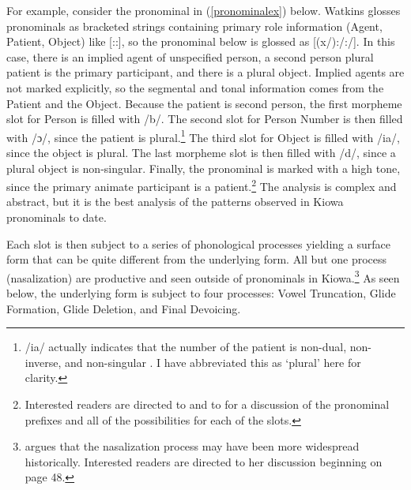 \documentclass[output=paper]{langscibook}
\begin{document}

For example, consider the pronominal in (\ref{pronominalex}) below. Watkins glosses pronominals as bracketed strings containing primary role information (Agent, Patient, Object) like {[\Aarg:\Parg:\Obj]}, so the pronominal below is glossed as {[(x/\Aarg):\Second\Pl/\Parg:\Pl/\Obj]}. In this case, there is an implied agent of unspecified person, a second person plural patient is the primary participant, and there is a plural object. Implied agents are not marked explicitly, so the segmental and tonal information comes from the Patient and the Object. Because the patient is second person, the first morpheme slot for Person is filled with /b/. The second slot for Person Number is then filled with /ɔ/, since the patient is plural.\footnote{/ia/ actually indicates that the number of the patient is non-dual, non-inverse, and non-singular \citep[118]{Watkins:1984}. I have abbreviated this as `plural' here for clarity.} The third slot for Object is filled with /ia/, since the object is plural. The last morpheme slot is then filled with /d/, since a plural object is non-singular. Finally, the pronominal is marked with a high tone, since the primary animate participant is a patient.\footnote{Interested readers are directed to \citet{Watkins:1984} and to \citet{miller:prep} for a discussion of the pronominal prefixes and all of the possibilities for each of the slots.} The analysis is complex and abstract, but it is the best analysis of the patterns observed in Kiowa pronominals to date.


Each slot is then subject to a series of phonological processes yielding a surface form that can be quite different from the underlying form. All but one process (nasalization) are productive and seen outside of pronominals in Kiowa.\footnote{\citet{Watkins:1984} argues that the nasalization process may have been more widespread historically. Interested readers are directed to her discussion beginning on page 48.} As seen below, the underlying form is subject to four processes: Vowel Truncation, Glide Formation, Glide Deletion, and Final Devoicing.
\end{document}
